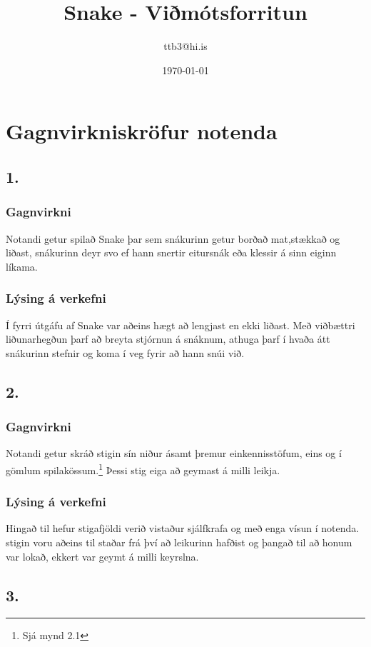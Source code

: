 \documentclass{article}
\title{Snake - Viðmótsforritun}
\author{ttb3@hi.is}
\date{\today}
\begin{document}
\maketitle


\section*{Gagnvirkniskröfur notenda}
\subsection*{1.}
\subsubsection*{Gagnvirkni}
    Notandi getur spilað Snake þar sem snákurinn getur borðað mat,stækkað og liðast, 
    snákurinn deyr svo ef hann snertir eitursnák eða klessir á sinn eiginn líkama.
\subsubsection*{Lýsing á verkefni} 
    Í fyrri útgáfu af Snake var aðeins hægt að lengjast en ekki liðast. 
    Með viðbættri liðunarhegðun þarf að breyta stjórnun á snáknum, 
    athuga þarf í hvaða átt snákurinn stefnir og koma í veg fyrir að hann snúi við.

\subsection*{2.}
\subsubsection*{Gagnvirkni}
Notandi getur skráð stigin sín niður ásamt þremur einkennisstöfum,
eins og í gömlum spilakössum.\footnote{Sjá mynd 2.1} Þessi stig eiga að geymast á milli leikja.

\subsubsection*{Lýsing á verkefni}
Hingað til hefur stigafjöldi verið vistaður sjálfkrafa og með enga vísun í notenda.
stigin voru aðeins til staðar frá því að leikurinn hafðist og þangað til að honum var lokað,
ekkert var geymt á milli keyrslna.

\subsection*{3.}
\end{document}
